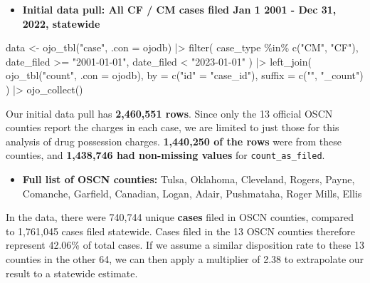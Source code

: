 \documentclass[
  letterpaper,
  DIV=11,
  numbers=noendperiod]{scrartcl}
\newenvironment{Shaded}{\begin{snugshade}}{\end{snugshade}}
\newcommand{\AttributeTok}[1]{\textcolor[rgb]{0.40,0.45,0.13}{#1}}
\newcommand{\FunctionTok}[1]{\textcolor[rgb]{0.28,0.35,0.67}{#1}}
\newcommand{\NormalTok}[1]{\textcolor[rgb]{0.00,0.23,0.31}{#1}}
\newcommand{\OtherTok}[1]{\textcolor[rgb]{0.00,0.23,0.31}{#1}}
\newcommand{\SpecialCharTok}[1]{\textcolor[rgb]{0.37,0.37,0.37}{#1}}
\newcommand{\StringTok}[1]{\textcolor[rgb]{0.13,0.47,0.30}{#1}}
\providecommand{\tightlist}{%
  \setlength{\itemsep}{0pt}\setlength{\parskip}{0pt}}\usepackage{longtable,booktabs,array}
\begin{document}
\begin{itemize}
\tightlist
\item
  \textbf{Initial data pull: All CF / CM cases filed Jan 1 2001 - Dec
  31, 2022, statewide}
\end{itemize}

\begin{Shaded}
\begin{Highlighting}[]
\NormalTok{data }\OtherTok{\textless{}{-}} \FunctionTok{ojo\_tbl}\NormalTok{(}\StringTok{"case"}\NormalTok{, }\AttributeTok{.con =}\NormalTok{ ojodb) }\SpecialCharTok{|\textgreater{}}
  \FunctionTok{filter}\NormalTok{(}
\NormalTok{    case\_type }\SpecialCharTok{\%in\%} \FunctionTok{c}\NormalTok{(}\StringTok{"CM"}\NormalTok{, }\StringTok{"CF"}\NormalTok{),}
\NormalTok{    date\_filed }\SpecialCharTok{\textgreater{}=} \StringTok{"2001{-}01{-}01"}\NormalTok{,}
\NormalTok{    date\_filed }\SpecialCharTok{\textless{}} \StringTok{"2023{-}01{-}01"}
\NormalTok{  ) }\SpecialCharTok{|\textgreater{}}
  \FunctionTok{left\_join}\NormalTok{(}
    \FunctionTok{ojo\_tbl}\NormalTok{(}\StringTok{"count"}\NormalTok{, }\AttributeTok{.con =}\NormalTok{ ojodb),}
    \AttributeTok{by =} \FunctionTok{c}\NormalTok{(}\StringTok{"id"} \OtherTok{=} \StringTok{"case\_id"}\NormalTok{),}
    \AttributeTok{suffix =} \FunctionTok{c}\NormalTok{(}\StringTok{""}\NormalTok{, }\StringTok{"\_count"}\NormalTok{)}
\NormalTok{  ) }\SpecialCharTok{|\textgreater{}}
  \FunctionTok{ojo\_collect}\NormalTok{()}
\end{Highlighting}
\end{Shaded}

Our initial data pull has \textbf{2,460,551 rows}. Since only the 13
official OSCN counties report the charges in each case, we are limited
to just those for this analysis of drug possession charges.
\textbf{1,440,250 of the rows} were from these counties, and
\textbf{1,438,746 had non-missing values} for \texttt{count\_as\_filed}.

\begin{itemize}
\tightlist
\item
  \textbf{Full list of OSCN counties:} Tulsa, Oklahoma, Cleveland,
  Rogers, Payne, Comanche, Garfield, Canadian, Logan, Adair, Pushmataha,
  Roger Mills, Ellis
\end{itemize}

In the data, there were 740,744 unique \textbf{cases} filed in OSCN
counties, compared to 1,761,045 cases filed statewide. Cases filed in
the 13 OSCN counties therefore represent 42.06\% of total cases. If we
assume a similar disposition rate to these 13 counties in the other 64,
we can then apply a multiplier of 2.38 to extrapolate our result to a
statewide estimate.
\end{document}
